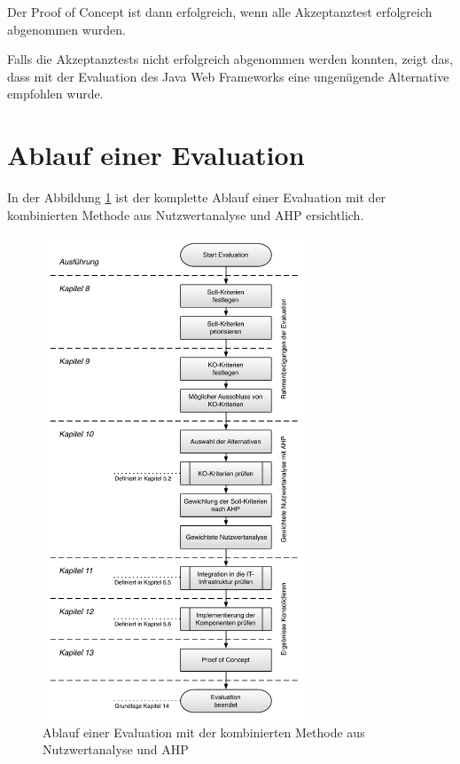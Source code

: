   Der Proof of Concept ist dann erfolgreich, wenn alle Akzeptanztest erfolgreich
  abgenommen wurden.
  
  Falls die Akzeptanztests nicht erfolgreich abgenommen werden konnten, zeigt
  das, dass mit der Evaluation des Java Web Frameworks eine ungenügende
  Alternative empfohlen wurde.
    
  \section{Ablauf einer Evaluation}
  
  In der Abbildung \ref{img:ablaufEvaluation} ist der komplette Ablauf einer
  Evaluation mit der kombinierten Methode aus Nutzwertanalyse und
  \ac{AHP} ersichtlich.
  
  \begin{figure}[h!]
    \begin{center}
      \includegraphics[width=0.7\textwidth]{./image/kompletterAblaufDerEvaluation.pdf}
      \caption{Ablauf einer Evaluation mit der kombinierten Methode aus
      Nutzwertanalyse und \ac{AHP}}
      \label{img:ablaufEvaluation}
    \end{center}
  \end{figure}
